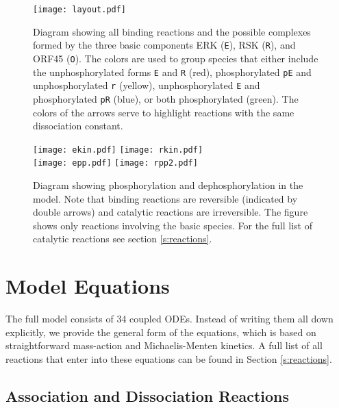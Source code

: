 \documentclass[12pt]{article}
\begin{document}
	\begin{figure}[h!]
		\centering \texttt{[image: layout.pdf]}
		\caption{Diagram showing all binding reactions and the possible complexes formed
			by the three basic components ERK (\texttt{E}), RSK (\texttt{R}),
			and ORF45 (\texttt{O}). The colors are used to group species that
			either include the unphosphorylated forms \texttt{E} and \texttt{R}
			(red), phosphorylated \texttt{pE} and unphosphorylated \texttt{r}
			(yellow), unphosphorylated \texttt{E} and phosphorylated \texttt{pR}
			(blue), or both phosphorylated (green). The colors of the arrows serve
			to highlight reactions with the same dissociation constant.}
		\label{fig:diagram} 
	\end{figure}
	
	\begin{figure}[h!]
		\centering \texttt{[image: ekin.pdf]}
		\texttt{[image: rkin.pdf]}\\
		\texttt{[image: epp.pdf]}
		\texttt{[image: rpp2.pdf]}
		\caption{Diagram showing phosphorylation and dephosphorylation in the model.
			Note that binding reactions are reversible (indicated
			by double arrows) and catalytic reactions are irreversible. The figure shows only reactions involving the basic species. For the full list of catalytic reactions see section \ref{s:reactions}.}
		\label{fig:catalytic} 
	\end{figure}
	
	
	\section{Model Equations}
	The full model consists of 34 coupled ODEs. Instead of writing them
	all down explicitly, we provide the general
	form of the equations, which is based on straightforward mass-action
	and Michaelis-Menten kinetics. A full list of all reactions that enter into these equations can be found in Section \ref{s:reactions}.
	
	\subsection{Association and Dissociation Reactions}
	
\end{document}
